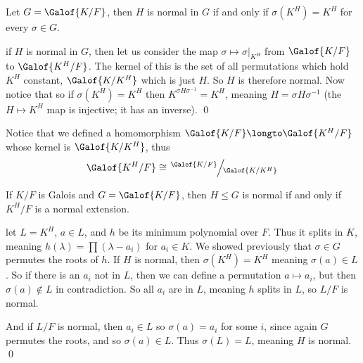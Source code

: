 \bcoro

    Let $G=\Galof{K/F}$, then $H$ is normal in $G$ if and only if $\sigma(K^H)=K^H$ for every $\sigma\in G$.

\ecoro

\Proof if $H$ is normal in $G$, then let us consider the map $\sigma\mapsto\sigma\bigl|_{K^H}$ from $\Galof{K/F}$ to $\Galof{K^H/F}$.
The kernel of this is the set of all permutations which hold $K^H$ constant, $\Galof{K/K^H}$ which is just $H$.
So $H$ is therefore normal.
Now notice that
so if $\sigma(K^H)=K^H$ then $K^{\sigma H\sigma^{-1}}=K^H$, meaning $H=\sigma H\sigma^{-1}$ (the $H\mapsto K^H$ map is injective; it has an inverse).
\qed

Notice that we defined a homomorphism $\Galof{K/F}\longto\Galof{K^H/F}$ whose kernel is $\Galof{K/K^H}$, thus
$$ \Galof{K^H/F} \cong \slfrac{\Galof{K/F}}{\Galof{K/K^H}} $$

\bprop

    If $K/F$ is Galois and $G=\Galof{K/F}$, then $H\leq G$ is normal if and only if $K^H/F$ is a normal extension.

\eprop

\Proof let $L=K^H$, $a\in L$, and $h$ be its minimum polynomial over $F$.
Thus it splits in $K$, meaning $h(\lambda)=\prod(\lambda-a_i)$ for $a_i\in K$.
We showed previously that $\sigma\in G$ permutes the roots of $h$.
If $H$ is normal, then $\sigma(K^H)=K^H$ meaning $\sigma(a)\in L$.
So if there is an $a_i$ not in $L$, then we can define a permutation $a\mapsto a_i$, but then $\sigma(a)\notin L$ in contradiction.
So all $a_i$ are in $L$, meaning $h$ splits in $L$, so $L/F$ is normal.

And if $L/F$ is normal, then $a_i\in L$ so $\sigma(a)=a_i$ for some $i$, since again $G$ permutes the roots, and so $\sigma(a)\in L$.
Thus $\sigma(L)=L$, meaning $H$ is normal.
\qed

\bye


